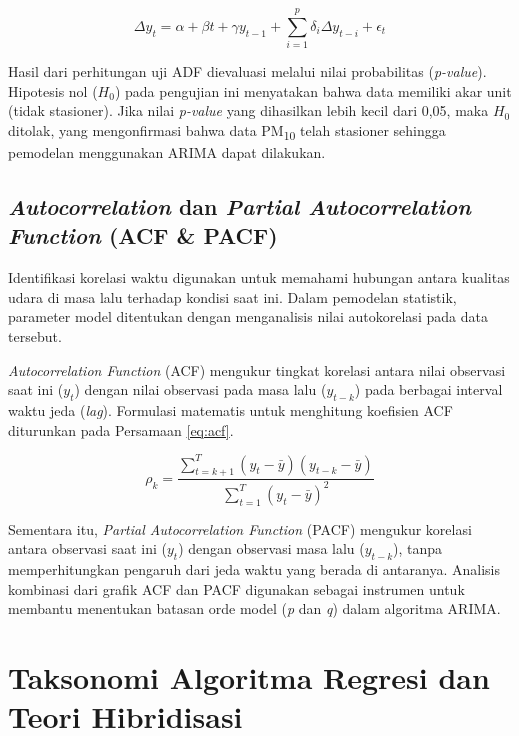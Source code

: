 \begin{equation}
\Delta y_t = \alpha + \beta t + \gamma y_{t-1} + \sum_{i=1}^{p} \delta_i \Delta y_{t-i} + \epsilon_t
\label{eq:adf}
\end{equation}

Hasil dari perhitungan uji ADF dievaluasi melalui nilai probabilitas (\textit{p-value}). Hipotesis nol ($H_0$) pada pengujian ini menyatakan bahwa data memiliki akar unit (tidak stasioner). Jika nilai \textit{p-value} yang dihasilkan lebih kecil dari 0,05, maka $H_0$ ditolak, yang mengonfirmasi bahwa data PM\textsubscript{10} telah stasioner sehingga pemodelan menggunakan ARIMA dapat dilakukan.

\subsection{\textit{Autocorrelation} dan \textit{Partial Autocorrelation Function} (ACF \& PACF)}

Identifikasi korelasi waktu digunakan untuk memahami hubungan antara kualitas udara di masa lalu terhadap kondisi saat ini. Dalam pemodelan statistik, parameter model ditentukan dengan menganalisis nilai autokorelasi pada data tersebut.

\textit{Autocorrelation Function} (ACF) mengukur tingkat korelasi antara nilai observasi saat ini ($y_t$) dengan nilai observasi pada masa lalu ($y_{t-k}$) pada berbagai interval waktu jeda (\textit{lag}). Formulasi matematis untuk menghitung koefisien ACF diturunkan pada Persamaan \ref{eq:acf}.

\begin{equation}
\rho_k = \frac{\sum_{t=k+1}^T (y_t - \bar{y})(y_{t-k} - \bar{y})}{\sum_{t=1}^T (y_t - \bar{y})^2}
\label{eq:acf}
\end{equation}

Sementara itu, \textit{Partial Autocorrelation Function} (PACF) mengukur korelasi antara observasi saat ini ($y_t$) dengan observasi masa lalu ($y_{t-k}$), tanpa memperhitungkan pengaruh dari jeda waktu yang berada di antaranya. Analisis kombinasi dari grafik ACF dan PACF digunakan sebagai instrumen untuk membantu menentukan batasan orde model (\textit{p} dan \textit{q}) dalam algoritma ARIMA.

\section{Taksonomi Algoritma Regresi dan Teori Hibridisasi}

